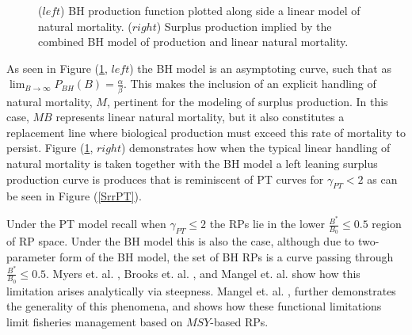 \begin{figure}[h!]
\begin{minipage}[h!]{0.49\textwidth}
\end{minipage}
\caption{\label{srrBH}
	($left$) BH production function plotted along side a linear model of natural mortality.
	($right$) Surplus production implied by the combined BH model of production and linear natural mortality.
}
\end{figure}

%
As seen in Figure (\ref{srrBH}, $left$) the BH model is an asymptoting curve, 
such that as $\lim_{B\to\infty}P_{BH}(B)=\frac{\alpha}{\beta}$. This makes the 
inclusion of an explicit handling of natural mortality, $M$, pertinent for 
the modeling of surplus production. In this case, $MB$ represents linear natural 
mortality, but it also constitutes a replacement line where biological production 
must exceed this rate of mortality to persist. Figure (\ref{srrBH}, $right$) 
demonstrates how when the typical linear handling of natural mortality is 
taken together with the BH model a left leaning surplus production curve is 
produces that is reminiscent of PT curves for $\gamma_{PT}<2$ as can be seen in 
Figure (\ref{SrrPT}).
  

%
Under the PT model recall when $\gamma_{PT}\le2$ the RPs lie in the lower 
$\frac{B^*}{B_0}\le0.5$ region of RP space. Under the BH model this is also the 
case, although due to two-parameter form of the BH model, the set of BH RPs is a 
curve passing through $\frac{B^*}{B_0}\le0.5$. Myers et. al. \cite{myers_maximum_1999}, 
Brooks et. al. \cite{brooks_analytical_2010}, and Mangel et. al. \cite{mangel_perspective_2013} 
show how this limitation arises analytically via steepness. Mangel et. al. \cite{mangel_perspective_2013}, 
further demonstrates the generality of this phenomena, and shows how these 
functional limitations limit fisheries management based on $MSY$-based RPs. 

